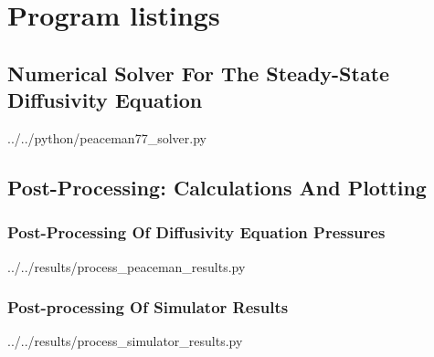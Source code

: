 \section{Program listings} %
\label{sec:program_listings}

\subsection{Numerical Solver For The Steady-State Diffusivity Equation} %
\label{sub:numerical_solver_for_the_steady_state_pressure_distribution_using_repeated_five_spot_pattern}


  {../../python/peaceman77_solver.py}

\clearpage
\subsection{Post-Processing: Calculations And Plotting} %
\label{sub:postprocessing_calculations_and_plotting}

\subsubsection{Post-Processing Of Diffusivity Equation Pressures} %
\label{ssub:postprocessing_of_peaceman_results}

  {../../results/process_peaceman_results.py}

\clearpage
\subsubsection{Post-processing Of Simulator Results} %
\label{ssub:postprocessing_of_simulator_results}

  {../../results/process_simulator_results.py}


